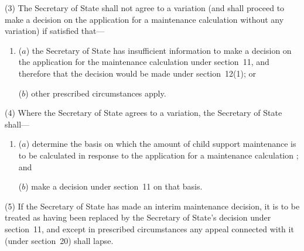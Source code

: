 \documentclass[12pt,a4paper]{article}
\begin{document}
(3) The 
Secretary of State  %
shall not agree to a variation (and shall proceed to make 
a  %
decision on the application for a maintenance calculation without any variation) if 
satisfied that—
\begin{enumerate}\item[]
($a$) 
the Secretary of State  %
has insufficient information to make a decision on the application for the maintenance calculation under section~11, and therefore that 
the  %
decision would be made under section~12(1); or

($b$) other prescribed circumstances apply.
\end{enumerate}

(4) Where the 
Secretary of State  %
agrees to a variation, 
the Secretary of State  %
shall—
\begin{enumerate}\item[]
($a$) determine the basis on which the amount of child support maintenance is to be calculated in response to the application for a maintenance calculation%
; and

($b$) make a decision under section~11 on that basis.
\end{enumerate}

(5) If the 
Secretary of State  %
has made an interim maintenance decision, it is to be treated as having been replaced by 
the Secretary of State's  %
decision under section~11, and except in prescribed circumstances any appeal connected with it (under section~20) shall lapse.
\end{document}
